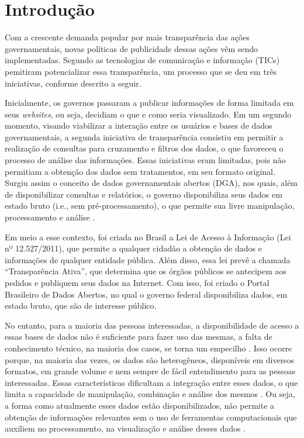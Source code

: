 
\chapter{Introdução}
\label{chap:introducao}

Com a crescente demanda popular por mais transparência das ações governamentais, novas
políticas de publicidade dessas ações vêm sendo implementadas. Segundo 
as tecnologias de comunicação e informação (TICs) pemitiram potencializar essa
transparência, um processo que se deu em três iniciativas, conforme descrito a seguir.

Inicialmente, os governos passaram a publicar informações de forma limitada em seus 
\textit{websites}, ou seja, decidiam o que e como seria visualizado. Em um segundo momento, 
visando viabilizar a interação entre os usuários e bases de dados governamentais, a segunda 
iniciativa de transparência consistiu em permitir a realização de consultas para cruzamento 
e filtros dos dados, o que favoreceu o processo de análise das informações. Essas iniciativas 
eram limitadas, pois não permitiam a obtenção dos dados sem tratamentos, em seu formato original. 
Surgiu assim o conceito de dados governamentais abertos (DGA), nos quais, além de 
disponibilizar consultas e relatórios, o governo disponibiliza seus dados em estado bruto
(i.e., sem pré-processamento), o que permite sua livre manipulação, processamento e 
análise \cite{vaz2010dados}.

Em meio a esse contexto, foi criada no Brasil a Lei de Acesso à Informação 
(Lei nº 12.527/2011), que permite a qualquer cidadão a obtenção de dados e informações 
de qualquer entidade pública. Além disso, essa lei prevê a chamada “Transparência Ativa”, 
que determina que os órgãos públicos se antecipem aos pedidos e publiquem seus dados na 
Internet. Com isso, foi criado o Portal Brasileiro de Dados Abertos, no qual o 
governo federal disponibiliza dados, em estado bruto, que são de interesse público. 

No entanto, para a maioria das pessoas interessadas, a disponibilidade de acesso a essas 
bases de dados não é suficiente para fazer uso das mesmas, a falta de conhecimento técnico, 
na maioria dos casos, se torna um empecilho \cite{graves2013}. Isso ocorre porque, na 
maioria das vezes, os dados são heterogêneos, disponíveis em diversos formatos, em grande 
volume e nem sempre de fácil entendimento para as pessoas interessadas. Essas características 
dificultam a integração entre esses dados, o que limita a capacidade de manipulação, 
combinação e análise dos mesmos \cite{hoxha2011open}. Ou seja, a forma como atualmente esses 
dados estão disponibilizados, não permite a obtenção de informações relevantes sem o uso de 
ferramentas computacionais que auxiliem no processamento, na visualização e análise desses 
dados \cite{vaz2010dados}. 

